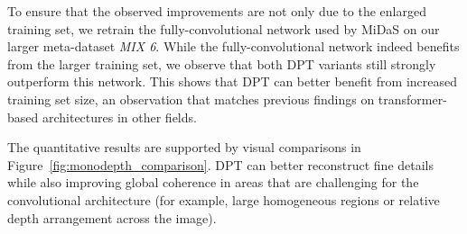 \documentclass[10pt,twocolumn,letterpaper]{article}
\begin{document}
To ensure that the observed improvements are not only due to the enlarged
training set, we retrain the fully-convolutional network used by MiDaS on our
larger meta-dataset \emph{MIX 6}. While the fully-convolutional network indeed
benefits from the larger training set, we observe that both DPT variants still
strongly outperform this network. This shows that DPT can better benefit from
increased training set size, an observation that matches previous findings on
transformer-based architectures in other fields.

The quantitative results are supported by visual comparisons in
Figure~\ref{fig:monodepth_comparison}. DPT can better reconstruct fine details
while also improving global coherence in areas that are challenging for the
convolutional architecture (for example, large homogeneous regions or relative
depth arrangement across the image).
\end{document}
